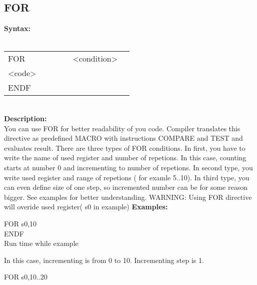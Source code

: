 {        \subsection{FOR}
            \textbf{Syntax:}\\
            \\ {
                \texttt{}
                    \begin{tabular}[h!]{llll}
                        { \color{highlight_directive} FOR } & \verb'     ' &
                        { \color{highlight_constant} <condition> }\\
                        { \color{highlight_symbol} <code> }\\
                        { \color{highlight_directive} ENDF }
                    \end{tabular}
                }\\
            \textbf{Description:}\\
            You can use FOR for better readability of you code. Compiler translates this directive as predefined MACRO with instructions COMPARE and TEST and
            evaluates result. There are three types of FOR conditions. In first, you have to write the name of used register and number of repetions. In this case,
            counting starts at number 0 and incrementing to number of repetions. In second type, you write used register and range of
            repetions ( for examle 5..10). In third type, you can even define size of one step, so incremented number can be for some reason bigger.
            See examples for better understanding. WARNING: Using FOR directive will overide used register( s0 in example)
            \textbf{Examples:}\\
                    \begin{code}[h!]
                            { \color{highlight_directive} FOR  }
                            { \color{highlight_constant}   s0,10 }\\
                            { \color{highlight_directive}  ENDF}\\
                        \caption{Run time while example}
                    \end{code}
            In this case, incrementing is from 0 to 10. Incrementing step is 1.
                    \begin{code}[h!]
                            { \color{highlight_directive} FOR  }
                            { \color{highlight_constant}   s0,10..20 }\\

\end{code}}
